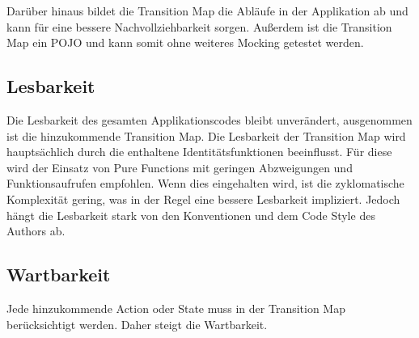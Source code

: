 Darüber hinaus bildet die Transition Map die Abläufe in der Applikation ab und kann für eine bessere Nachvollziehbarkeit sorgen. Außerdem ist die Transition Map ein POJO und kann somit ohne weiteres Mocking getestet werden.

\subsection{Lesbarkeit}
Die Lesbarkeit des gesamten Applikationscodes bleibt unverändert, ausgenommen ist die hinzukommende Transition Map. Die Lesbarkeit der Transition Map wird hauptsächlich durch die enthaltene Identitätsfunktionen beeinflusst. Für diese wird der Einsatz von Pure Functions mit geringen Abzweigungen und Funktionsaufrufen empfohlen. Wenn dies eingehalten wird, ist die zyklomatische Komplexität gering, was in der Regel eine bessere Lesbarkeit impliziert. Jedoch hängt die Lesbarkeit stark von den Konventionen und dem Code Style des Authors ab.

\subsection{Wartbarkeit}
Jede hinzukommende Action oder State muss in der Transition Map berücksichtigt werden. Daher steigt die Wartbarkeit.
